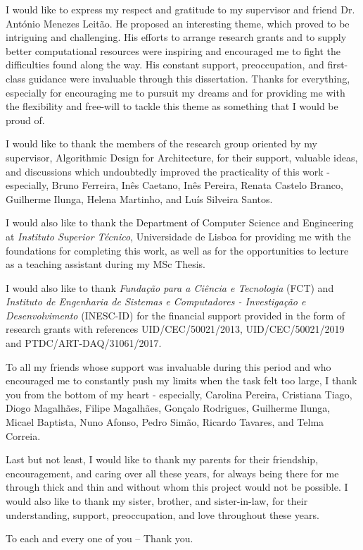
I would like to express my respect and gratitude to my supervisor and friend Dr. António Menezes Leitão. He proposed an interesting theme, which proved to be intriguing and challenging. His efforts to arrange research grants and to supply better computational resources were inspiring and encouraged me to fight the difficulties found along the way. His constant support, preoccupation, and first-class guidance were invaluable through this dissertation. Thanks for everything, especially for encouraging me to pursuit my dreams and for providing me with the flexibility and free-will to tackle this theme as something that I would be proud of.  

I would like to thank the members of the research group oriented by my supervisor, Algorithmic Design for Architecture, for their support, valuable ideas, and discussions which undoubtedly improved the practicality of this work - especially, Bruno Ferreira, Inês Caetano, Inês Pereira, Renata Castelo Branco, Guilherme Ilunga, Helena Martinho, and Luís Silveira Santos. 

I would also like to thank the Department of Computer Science and Engineering at \textit{Instituto Superior Técnico}, Universidade de Lisboa for providing me with the foundations for completing this work, as well as for the opportunities to lecture as a teaching assistant during my MSc Thesis. 

I would also like to thank \textit{Fundação para a Ciência e Tecnologia} (FCT) and \textit{Instituto de Engenharia de Sistemas e Computadores - Investigação e Desenvolvimento} (INESC-ID) for the financial support provided in the form of research grants with references UID/CEC/50021/2013, UID/CEC/50021/2019 and PTDC/ART-DAQ/31061/2017.


To all my friends whose support was invaluable during this period and who encouraged me to constantly push my limits when the task felt too large, I thank you from the bottom of my heart - especially, Carolina Pereira, Cristiana Tiago, Diogo Magalhães, Filipe Magalhães, Gonçalo Rodrigues, Guilherme Ilunga, Micael Baptista, Nuno Afonso, Pedro Simão, Ricardo Tavares, and Telma Correia.

Last but not least, I would like to thank my parents for their friendship, encouragement, and caring over all these years, for always being there for me through thick and thin and without whom this project would not be possible. I would also like to thank my sister, brother, and sister-in-law, for their understanding, support, preoccupation, and love throughout these years.

To each and every one of you -- Thank you.